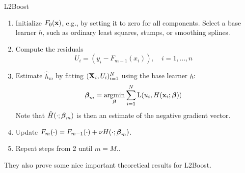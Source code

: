 \begin{algorithm}
\caption{L2Boost}
\label{algo:l2}
\begin{enumerate}
    \item Initialize $F_0(\mathbf{x})$, e.g., by setting it to zero for all components. Select a base learner $h$, such as ordinary least squares, stumps, or smoothing splines.
    \item Compute the residuals
        \begin{equation*}
            U_i=(y_i - F_{m-1}(x_i)),\quad i=1,\dotsc,n
        \end{equation*}
    \item Estimate $\hat{h}_m$ by fitting $(\mathbf{X}_i,U_i)_{i=1}^N$ using the base learner $h$:
        \begin{equation*}
            \boldsymbol{\beta}_m=\operatorname*{argmin}_{\boldsymbol{\beta}}\sum_{i=1}^N\operatorname{L}(u_i,H(\mathbf{x}_i;\boldsymbol{\beta}))
        \end{equation*}
        Note that $\hat{H}(\cdot;\boldsymbol{\beta}_m)$ is then an estimate of the negative gradient vector.
    \item Update $F_m(\cdot)=F_{m-1}(\cdot)+\nu H(\cdot;\boldsymbol{\beta}_m)$.
    \item Repeat steps from 2 until $m=M$..
\end{enumerate}
\end{algorithm}
They also prove some nice important theoretical results for L2Boost.



